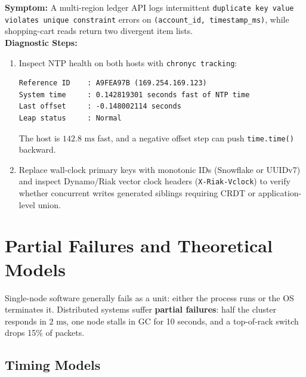\begin{realworldbox}
\textbf{Symptom:} A multi-region ledger API logs intermittent \texttt{duplicate key value violates unique constraint} errors on \texttt{(account\_id, timestamp\_ms)}, while shopping-cart reads return two divergent item lists.\\
\textbf{Diagnostic Steps:}
\begin{enumerate}[leftmargin=16pt]
  \item Inspect NTP health on both hosts with \texttt{chronyc tracking}:
\begin{verbatim}
Reference ID    : A9FEA97B (169.254.169.123)
System time     : 0.142819301 seconds fast of NTP time
Last offset     : -0.148002114 seconds
Leap status     : Normal
\end{verbatim}
  The host is $142.8\text{ ms}$ fast, and a negative offset step can push \texttt{time.time()} backward.
  \item Replace wall-clock primary keys with monotonic IDs (Snowflake or UUIDv7) and inspect Dynamo/Riak vector clock headers (\texttt{X-Riak-Vclock}) to verify whether concurrent writes generated siblings requiring CRDT or application-level union.
\end{enumerate}
\end{realworldbox}

\section{Partial Failures and Theoretical Models}

Single-node software generally fails as a unit: either the process runs or the OS terminates it. Distributed systems suffer \textbf{partial failures}: half the cluster responds in $2\text{ ms}$, one node stalls in GC for 10 seconds, and a top-of-rack switch drops 15\% of packets.

\subsection{Timing Models}

